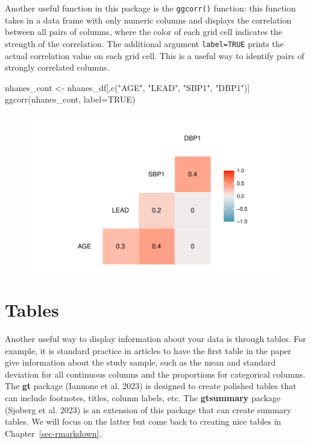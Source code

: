 \documentclass[
  letterpaper,
]{krantz}
\makeatletter
\newenvironment{Shaded}{\begin{snugshade}}{\end{snugshade}}
\newcommand{\AttributeTok}[1]{\textcolor[rgb]{0.40,0.45,0.13}{#1}}
\newcommand{\ConstantTok}[1]{\textcolor[rgb]{0.56,0.35,0.01}{#1}}
\newcommand{\FunctionTok}[1]{\textcolor[rgb]{0.28,0.35,0.67}{#1}}
\newcommand{\NormalTok}[1]{\textcolor[rgb]{0.00,0.23,0.31}{#1}}
\newcommand{\OtherTok}[1]{\textcolor[rgb]{0.00,0.23,0.31}{#1}}
\newcommand{\StringTok}[1]{\textcolor[rgb]{0.13,0.47,0.30}{#1}}
\newenvironment{kframe}{%
\medskip{}
\setlength{\fboxsep}{.8em}
 \def\at@end@of@kframe{}%
 \ifinner\ifhmode%
  \def\at@end@of@kframe{\end{minipage}}%
  \begin{minipage}{\columnwidth}%
 \fi\fi%
 \def\FrameCommand##1{\hskip\@totalleftmargin \hskip-\fboxsep
 \colorbox{shadecolor}{##1}\hskip-\fboxsep
     \hskip-\linewidth \hskip-\@totalleftmargin \hskip\columnwidth}%
 \MakeFramed {\advance\hsize-\width
   \@totalleftmargin\z@ \linewidth\hsize
   \@setminipage}}%
 {\par\unskip\endMakeFramed%
 \at@end@of@kframe}
\renewenvironment{Shaded}{\begin{kframe}}{\end{kframe}}
\makeatother
\begin{document}
Another useful function in this package is the \texttt{ggcorr()}
function: this function takes in a data frame with only numeric columns
and displays the correlation between all pairs of columns, where the
color of each grid cell indicates the strength of the correlation. The
additional argument \texttt{label=TRUE} prints the actual correlation
value on each grid cell. This is a useful way to identify pairs of
strongly correlated columns.

\begin{Shaded}
\begin{Highlighting}[]
\NormalTok{nhanes\_cont }\OtherTok{\textless{}{-}}\NormalTok{ nhanes\_df[,}\FunctionTok{c}\NormalTok{(}\StringTok{"AGE"}\NormalTok{, }\StringTok{"LEAD"}\NormalTok{, }\StringTok{"SBP1"}\NormalTok{, }\StringTok{"DBP1"}\NormalTok{)]}
\FunctionTok{ggcorr}\NormalTok{(nhanes\_cont, }\AttributeTok{label=}\ConstantTok{TRUE}\NormalTok{)}
\end{Highlighting}
\end{Shaded}

\begin{figure}[H]

{\centering \includegraphics[width=1\textwidth,height=\textheight]{book/4_exploratory_analysis_files/figure-pdf/unnamed-chunk-24-1.pdf}

}

\end{figure}

\hypertarget{tables}{%
\section{Tables}\label{tables}}

Another useful way to display information about your data is through
tables. For example, it is standard practice in articles to have the
first table in the paper give information about the study sample, such
as the mean and standard deviation for all continuous columns and the
proportions for categorical columns. The \textbf{gt} package (Iannone et
al. 2023) is designed to create polished tables that can include
footnotes, titles, column labels, etc. The \textbf{gtsummary} package
(Sjoberg et al. 2023) is an extension of this package that can create
summary tables. We will focus on the latter but come back to creating
nice tables in Chapter~\ref{sec-rmarkdown}.
\end{document}
